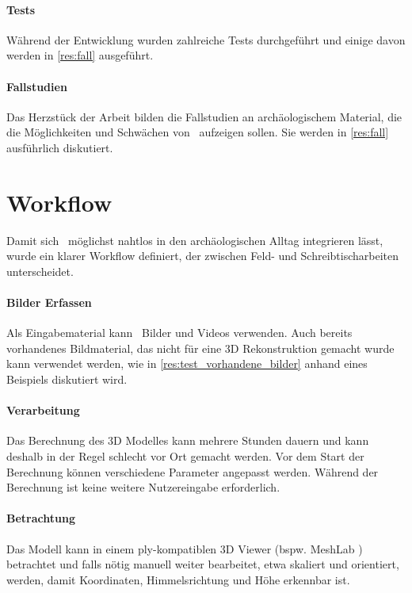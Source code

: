 		\paragraph{Tests}
		Während der Entwicklung wurden zahlreiche Tests durchgeführt und einige davon werden in \autoref{res:fall} ausgeführt.
		
		\paragraph{Fallstudien}
		Das Herzstück der Arbeit bilden die Fallstudien an archäologischem Material, die die Möglichkeiten und Schwächen von \dronarch\ aufzeigen sollen. Sie werden in \autoref{res:fall} ausführlich diskutiert.
		
	\section{Workflow}
		Damit sich \dronarch\ möglichst nahtlos in den archäologischen Alltag integrieren lässt, wurde ein klarer Workflow definiert, der zwischen Feld- und Schreibtischarbeiten unterscheidet.
		
		\paragraph{Bilder Erfassen}
			Als Eingabematerial kann \dronarch\ Bilder und Videos verwenden.
			Auch bereits vorhandenes Bildmaterial, das nicht für eine 3D Rekonstruktion gemacht wurde kann  verwendet werden, wie in \autoref{res:test_vorhandene_bilder} anhand eines Beispiels diskutiert wird.
		
		\paragraph{Verarbeitung}
			Das Berechnung des 3D Modelles kann mehrere Stunden dauern und kann deshalb in der Regel schlecht vor Ort gemacht werden. Vor dem Start der Berechnung können verschiedene Parameter angepasst werden. %
			Während der Berechnung ist keine weitere Nutzereingabe erforderlich.
		
		\paragraph{Betrachtung}
			Das Modell kann in einem ply-kompatiblen 3D Viewer (bspw. MeshLab ) betrachtet und falls nötig manuell weiter bearbeitet, etwa skaliert und orientiert, werden, damit Koordinaten, Himmelsrichtung und Höhe erkennbar ist.


